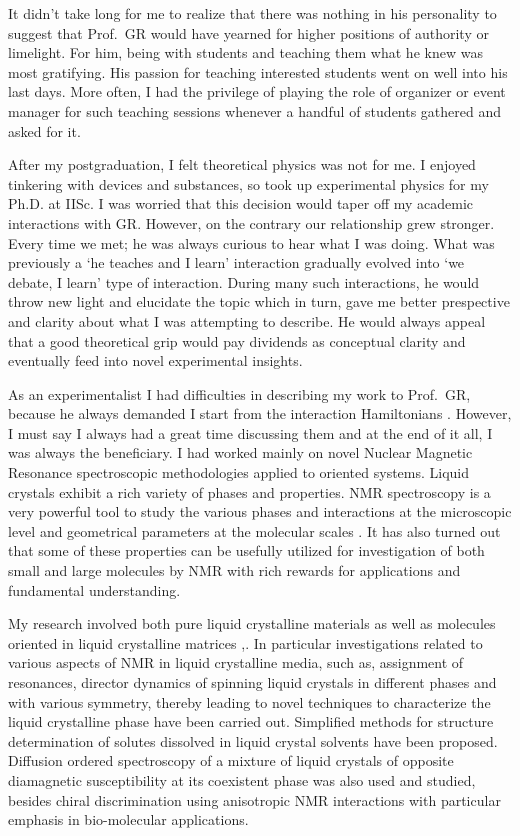 It didn't take long for me to realize that there was nothing in his personality to
suggest that Prof.\ GR would have yearned for higher positions of authority or
limelight. For him, being with students and teaching them what he knew was most
gratifying. His passion for teaching interested students went on well into his last
days. More often, I had the privilege of playing the role of organizer or event
manager for such teaching sessions whenever a handful of students gathered and
asked for it.

After my postgraduation, I felt theoretical physics was not for me. I enjoyed
tinkering with devices and substances, so took up experimental physics for my
Ph.D. at IISc. I was worried that this decision would taper off my academic
interactions with GR. However, on the contrary our relationship grew stronger.
Every time we met; he was always curious to hear what I was doing. What was
previously a `he teaches and I learn' interaction gradually evolved into `we
debate, I learn' type of interaction. During many such interactions, he would
throw new light and elucidate the topic which in turn, gave me better prespective
and clarity about what I was attempting to describe. He would always appeal that
a good theoretical grip would pay dividends as conceptual clarity and eventually
feed into novel experimental insights.

As an experimentalist I had difficulties in describing my work to Prof.\ GR,
because he always demanded I start from the interaction Hamiltonians \cite{chap31-key1}.
However, I must say I always had a great time discussing them and at the end of
it all, I was always the beneficiary. I had worked mainly on novel Nuclear
Magnetic Resonance spectroscopic methodologies applied to oriented systems.
Liquid crystals exhibit a rich variety of phases and properties. NMR spectroscopy
is a very powerful tool to study the various phases and interactions at the
microscopic level and geometrical parameters at the molecular scales \cite{chap31-key2}. It has
also turned out that some of these properties can be usefully utilized for
investigation of both small and large molecules by NMR with rich rewards for
applications and fundamental understanding.

My research involved both pure liquid crystalline materials as well as molecules
oriented in liquid crystalline matrices \cite{chap31-key3},\cite{chap31-key16}. In particular investigations related
to various aspects of NMR in liquid crystalline media, such as, assignment of
resonances, director dynamics of spinning liquid crystals in different phases and
with various symmetry, thereby leading to novel techniques to characterize the
liquid crystalline phase have been carried out. Simplified methods for structure
determination of solutes dissolved in liquid crystal solvents have been proposed.
Diffusion ordered spectroscopy of a mixture of liquid crystals of opposite
diamagnetic susceptibility at its coexistent phase was also used and studied,
besides chiral discrimination using anisotropic NMR interactions with particular
emphasis in bio-molecular applications.

